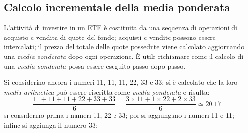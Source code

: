 \documentclass[12pt,a4paper]{article}
\begin{document}
\subsection{Calcolo incrementale della media ponderata}


L'attività di  investire in  un ETF  è costituita  da una  sequenza di  operazioni di
acquisto e vendita di quote del fondo; acquisti e vendite possono essere intercalati;
il  prezzo  del  totale  delle   quote  possedute  viene  calcolato  aggiornando  una
\emph{media ponderata} dopo  ogni operazione.  È utile richiamare come  il calcolo di
una \emph{media ponderata} possa essere eseguito passo dopo passo.

Si considerino  ancora i  numeri \num{11}, \num{11},  \num{11}, \num{22},  \num{33} e
\num{33}; si  è calcolato che  la loro  \emph{media aritmetica} può  essere riscritta
come \emph{media ponderata} e risulta:
\begin{equation*}
  \frac{\num{11} + \num{11} + \num{11} + \num{22} + \num{33} + \num{33}}{6}
  = \frac{\num{3} \times{} \num{11}
     + \num{1} \times{} \num{22}
     + \num{2} \times{} \num{33}}
  {6} \simeq \num{20,17}
\end{equation*}
si considerino  prima i  numeri \num{11},  \num{22} e \num{33};  poi si  aggiungano i
numeri \num{11} e \num{11}; infine si aggiunga il numero \num{33}:
\end{document}
